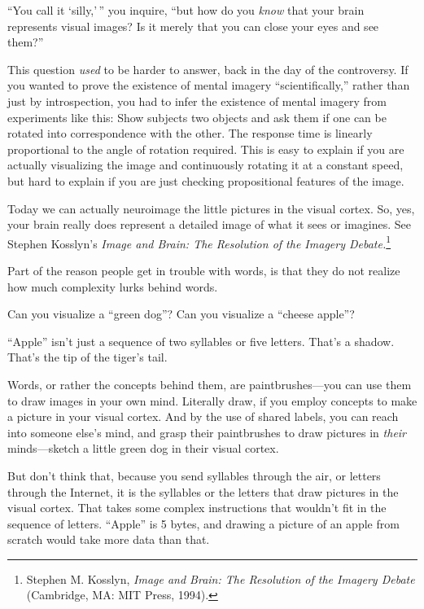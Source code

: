 { ``You call it
`silly,'\,'' you
inquire, ``but how do you \textit{know} that your
brain represents visual images? Is it merely that you can close your
eyes and see them?''


 This question \textit{used} to be harder to answer, back in the
day of the controversy. If you wanted to prove the existence of mental
imagery ``scientifically,'' rather
than just by introspection, you had to infer the existence of mental
imagery from experiments like this: Show subjects two objects and ask
them if one can be rotated into correspondence with the other. The
response time is linearly proportional to the angle of rotation
required. This is easy to explain if you are actually visualizing the
image and continuously rotating it at a constant speed, but hard to
explain if you are just checking propositional features of the image.

{
 Today we can actually neuroimage the little pictures in the visual
cortex. So, yes, your brain really does represent a detailed image of
what it sees or imagines. See Stephen Kosslyn's
\textit{Image and Brain: The Resolution of the Imagery
Debate.}\footnote{Stephen M. Kosslyn, \textit{Image and Brain: The Resolution of
the Imagery Debate} (Cambridge, MA: MIT Press, 1994).}}


 Part of the reason people get in trouble with words, is that they
do not realize how much complexity lurks behind words.


 Can you visualize a ``green
dog''? Can you visualize a ``cheese
apple''?


 ``Apple'' isn't
just a sequence of two syllables or five letters.
That's a shadow. That's the tip of the
tiger's tail.


 Words, or rather the concepts behind them, are paintbrushes---you
can use them to draw images in your own mind. Literally draw, if you
employ concepts to make a picture in your visual cortex. And by the use
of shared labels, you can reach into someone else's
mind, and grasp their paintbrushes to draw pictures in \textit{their}
minds---sketch a little green dog in their visual cortex.


 But don't think that, because you send syllables
through the air, or letters through the Internet, it is the syllables
or the letters that draw pictures in the visual cortex. That takes some
complex instructions that wouldn't fit in the sequence
of letters. ``Apple'' is 5 bytes,
and drawing a picture of an apple from scratch would take more data
than that.


}
